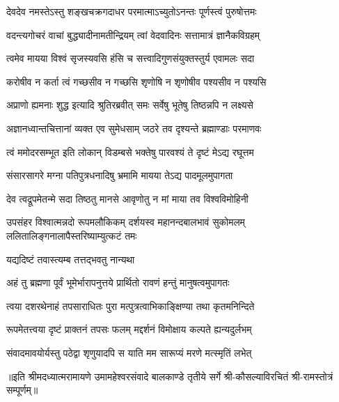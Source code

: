 

\addtocounter{shlokacount}{19}
\twolineshloka
{देवदेव नमस्तेऽस्तु शङ्खचक्रगदाधर}
{परमात्माऽच्युतोऽनन्तः पूर्णस्त्वं पुरुषोत्तमः} %

\twolineshloka
{वदन्त्यगोचरं वाचां बुद्ध्यादीनामतीन्द्रियम्}
{त्वां वेदवादिनः सत्तामात्रं ज्ञानैकविग्रहम्} %

\twolineshloka
{त्वमेव मायया विश्वं सृजस्यवसि हंसि च}
{सत्त्वादिगुणसंयुक्तस्तुर्य एवामलः सदा} %

\twolineshloka
{करोषीव न कर्ता त्वं गच्छसीव न गच्छसि}
{शृणोषि न शृणोषीव पश्यसीव न पश्यसि} %

\twolineshloka
{अप्राणो ह्यमनाः शुद्ध इत्यादि श्रुतिरब्रवीत्}
{समः सर्वेषु भूतेषु तिष्ठन्नपि न लक्ष्यसे} %

\twolineshloka
{अज्ञानध्वान्तचित्तानां व्यक्त एव सुमेधसाम्}
{जठरे तव दृश्यन्ते ब्रह्माण्डाः परमाणवः} %

\twolineshloka
{त्वं ममोदरसम्भूत इति लोकान् विडम्बसे}
{भक्तेषु पारवश्यं ते दृष्टं मेऽद्य रघूत्तम} %

\twolineshloka
{संसारसागरे मग्ना पतिपुत्रधनादिषु}
{भ्रमामि मायया तेऽद्य पादमूलमुपागता} %

\twolineshloka
{देव त्वद्रूपमेतन्मे सदा तिष्ठतु मानसे}
{आवृणोतु न मां माया तव विश्वविमोहिनी} %

\threelineshloka
{उपसंहर विश्वात्मन्नदो रूपमलौकिकम्}
{दर्शयस्व महानन्दबालभावं सुकोमलम्}
{ललितालिङ्गनालापैस्तरिष्याम्युत्कटं तमः} %


\onelineshloka
{यद्यदिष्टं तवास्त्यम्ब तत्तद्भवतु नान्यथा} %

\twolineshloka
{अहं तु ब्रह्मणा पूर्वं भूमेर्भारापनुत्तये}
{प्रार्थितो रावणं हन्तुं मानुषत्वमुपागतः} %

\twolineshloka
{त्वया दशरथेनाहं तपसाराधितः पुरा}
{मत्पुत्रत्वाभिकाङ्क्षिण्या तथा कृतमनिन्दिते} %

\twolineshloka
{रूपमेतत्त्वया दृष्टं प्राक्तनं तपसः फलम्}
{मद्दर्शनं विमोक्षाय कल्पते ह्यन्यदुर्लभम्} %

\twolineshloka
{संवादमावयोर्यस्तु पठेद्वा शृणुयादपि}
{स याति मम सारूप्यं मरणे मत्स्मृतिं लभेत्} %

{॥इति श्रीमदध्यात्मरामायणे उमामहेश्वरसंवादे बालकाण्डे
तृतीये सर्गे श्री-कौसल्याविरचितं श्री-रामस्तोत्रं सम्पूर्णम्॥}
